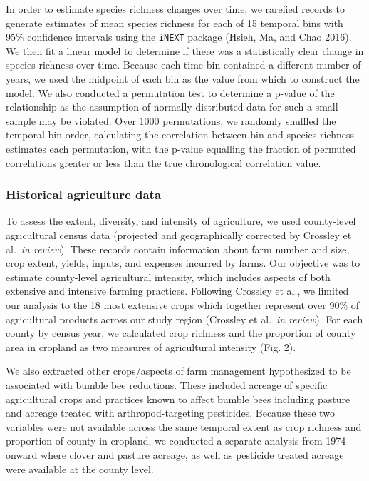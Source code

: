 \documentclass[11pt,]{article}
\begin{document}
In order to estimate species richness changes over time, we rarefied
records to generate estimates of mean species richness for each of 15
temporal bins with 95\% confidence intervals using the \texttt{iNEXT}
package (Hsieh, Ma, and Chao 2016). We then fit a linear model to
determine if there was a statistically clear change in species richness
over time. Because each time bin contained a different number of years,
we used the midpoint of each bin as the value from which to construct
the model. We also conducted a permutation test to determine a p-value
of the relationship as the assumption of normally distributed data for
such a small sample may be violated. Over 1000 permutations, we randomly
shuffled the temporal bin order, calculating the correlation between bin
and species richness estimates each permutation, with the p-value
equalling the fraction of permuted correlations greater or less than the
true chronological correlation value.

\hypertarget{historical-agriculture-data}{%
\subsubsection{Historical agriculture
data}\label{historical-agriculture-data}}

To assess the extent, diversity, and intensity of agriculture, we used
county-level agricultural census data (projected and geographically
corrected by Crossley et al.~\emph{in review}). These records contain
information about farm number and size, crop extent, yields, inputs, and
expenses incurred by farms. Our objective was to estimate county-level
agricultural intensity, which includes aspects of both extensive and
intensive farming practices. Following Crossley et al., we limited our
analysis to the 18 most extensive crops which together represent over
90\% of agricultural products across our study region (Crossley et
al.~\emph{in review}). For each county by census year, we calculated
crop richness and the proportion of county area in cropland as two
measures of agricultural intensity (Fig. 2).

We also extracted other crops/aspects of farm management hypothesized to
be associated with bumble bee reductions. These included acreage of
specific agricultural crops and practices known to affect bumble bees
including pasture and acreage treated with arthropod-targeting
pesticides. Because these two variables were not available across the
same temporal extent as crop richness and proportion of county in
cropland, we conducted a separate analysis from 1974 onward where clover
and pasture acreage, as well as pesticide treated acreage were available
at the county level.
\end{document}
